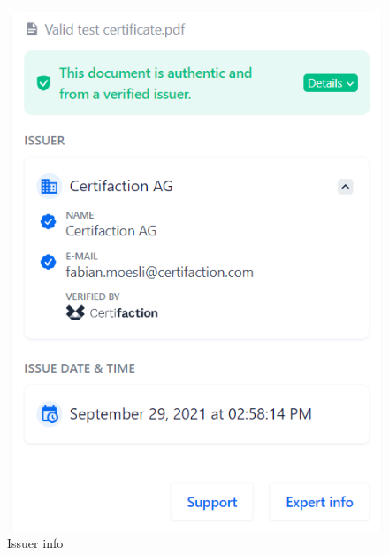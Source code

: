 \enskip \enskip \enskip 
\graphicspath{ {./images/} }
\begin{figure}[htbp]
  \centering 
  \includegraphics[scale=0.3]{8.png}
  \caption[Issuer info]{Issuer info}
  \label{6}
\end{figure}


